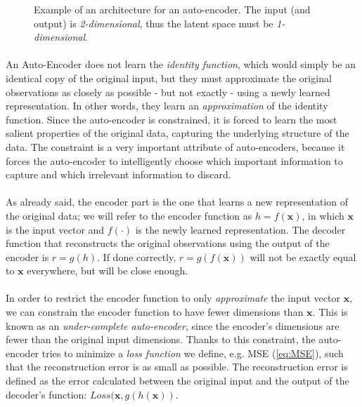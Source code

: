 \begin{figure}[h]
    \centering
    
    \caption{Example of an architecture for an auto-encoder. The input (and output) is \textit{2-dimensional}, thus the latent space must be \textit{1-dimensional}.}
\end{figure}

\paragraph{}
An Auto-Encoder does not learn the \textit{identity function}, which would simply be an identical copy of the original input, but they must approximate the original observations as closely as possible - but not exactly - using a newly learned representation. In other words, they learn an \textit{approximation} of the identity function. \newline
Since the auto-encoder is constrained, it is forced to learn the most salient properties of the original data, capturing the underlying structure of the data. The constraint is a very important attribute of auto-encoders, because it forces the auto-encoder to intelligently choose which important information to capture and which irrelevant information to discard.

\paragraph{}
As already said, the encoder part is the one that learns a new representation of the original data; we will refer to the encoder function as $h = f(\textbf{x})$, in which $\textbf{x}$ is the input vector and $f(\cdot)$ is the newly learned representation. The decoder function that reconstructs the original observations using the output of the encoder is $r = g(h)$. If done correctly, $r = g(f(\textbf{x}))$ will not be exactly equal to $\textbf{x}$ everywhere, but will be close enough.

\paragraph{}
In order to restrict the encoder function to only \textit{approximate} the input vector $\textbf{x}$, we can constrain the encoder function to have fewer dimensions than $\textbf{x}$. This is known as an \textit{under-complete auto-encoder}, since the encoder's dimensions are fewer than the original input dimensions. Thanks to this constraint, the auto-encoder tries to minimize a \textit{loss function} we define, e.g. MSE (\ref{eq:MSE}), such that the reconstruction error is as small as possible. The reconstruction error is defined as the error calculated between the original input and the output of the decoder's function: $Loss(\textbf{x}, g(h(\textbf{x}))$.

